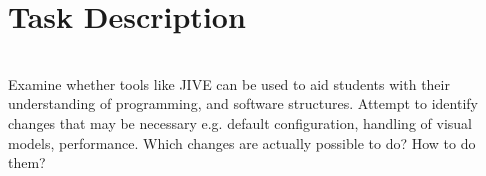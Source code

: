 \section{Task Description}\label{Task Description}
~\\
Examine whether tools like JIVE can be used to aid students with their understanding of programming, and software structures.
Attempt to identify changes that may be necessary e.g. default configuration, handling of visual models, performance.
Which changes are actually possible to do?
How to do them?
